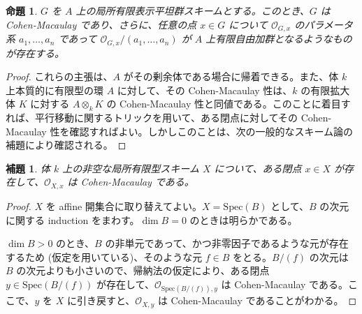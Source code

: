 \documentclass{jsarticle}
\newcommand{\Spec}{\mathrm{Spec}}
\newtheorem{prop}[thm]{命題}
\newtheorem{lem}[thm]{補題}
\begin{document}
\begin{prop}
  $G$ を $A$ 上の局所有限表示平坦群スキームとする。このとき、$G$ は Cohen-Macaulay であり、さらに、任意の点 $x \in G$ について $\mathcal{O}_{G, x}$ のパラメータ系 $a_1, \ldots, a_n$ であって $\mathcal{O}_{G, x} / (a_1, \ldots, a_n)$ が $A$ 上有限自由加群となるようなものが存在する。
\end{prop}
\begin{proof}
  これらの主張は、$A$ がその剰余体である場合に帰着できる。また、体 $k$ 上本質的に有限型の環 $A$ に対して、その Cohen-Macaulay 性は、$k$ の有限拡大体 $K$ に対する $A \otimes_k K$ の Cohen-Macaulay 性と同値である。このことに着目すれば、平行移動に関するトリックを用いて、ある閉点に対してその Cohen-Macaulay 性を確認すればよい。しかしこのことは、次の一般的なスキーム論の補題により確認される。
\end{proof}

\begin{lem}
  体 $k$ 上の非空な局所有限型スキーム $X$ について、ある閉点 $x \in X$ が存在して、$\mathcal{O}_{X, x}$ は Cohen-Macaulay である。
\end{lem}
\begin{proof}
  $X$ を affine 開集合に取り替えてよい。$X = \Spec(B)$ として、$B$ の次元に関する induction をまわす。$\dim B = 0$ のときは明らかである。

  $\dim B > 0$ のとき、$B$ の非単元であって、かつ非零因子であるような元が存在するため (仮定を用いている)、そのような元 $f \in B$ をとる。$B / (f)$ の次元は $B$ の次元よりも小さいので、帰納法の仮定により、ある閉点 $y \in \Spec(B / (f))$ が存在して、$\mathcal{O}_{\Spec(B / (f)), y}$ は Cohen-Macaulay である。ここで、$y$ を $X$ に引き戻すと、$\mathcal{O}_{X, y}$ は Cohen-Macaulay であることがわかる。
\end{proof}
\end{document}
